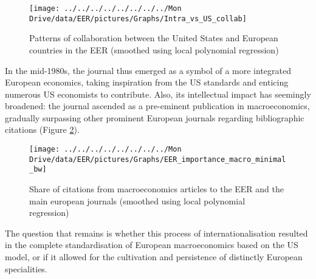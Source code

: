 \documentclass[
  12pt,
  onecolumn]{article}
\begin{document}
\begin{figure}[h]

{\centering \texttt{[image: ../../../../../../../../Mon Drive/data/EER/pictures/Graphs/Intra\_vs\_US\_collab]} 

}

\caption{Patterns of collaboration between the United States and European countries in the EER (smoothed using local polynomial regression)\protect\footnotemark}\label{fig:plot-collabs}
\end{figure}


In the mid-1980s, the journal thus emerged as a symbol of a more
integrated European economics, taking inspiration from the US standards
and enticing numerous US economists to contribute. Also, its
intellectual impact has seemingly broadened: the journal ascended as a
pre-eminent publication in macroeconomics, gradually surpassing other
prominent European journals regarding bibliographic citations (Figure
\ref{fig:plot-eer-importance-macro}).

\begin{figure}[h]

{\centering \texttt{[image: ../../../../../../../../Mon Drive/data/EER/pictures/Graphs/EER\_importance\_macro\_minimal\_bw]} 

}

\caption{Share of citations from macroeconomics articles to the EER and the main european journals (smoothed using local polynomial regression)\protect\footnotemark}\label{fig:plot-eer-importance-macro}
\end{figure}


The question that remains is whether this process of
internationalisation resulted in the complete standardisation of
European macroeconomics based on the US model, or if it allowed for the
cultivation and persistence of distinctly European specialities.
\end{document}

